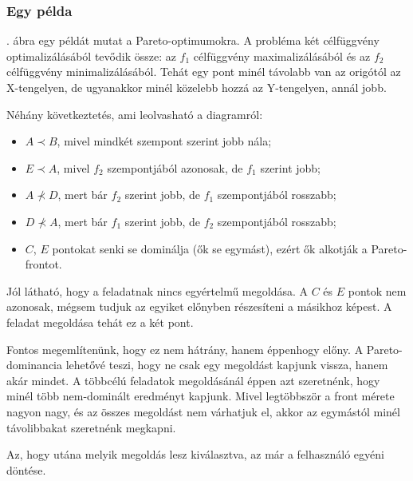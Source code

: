 \subsubsection{Egy példa}
. ábra egy példát mutat a Pareto-optimumokra.
A probléma két célfüggvény optimalizálásából tevődik össze: az $f_1$ célfüggvény maximalizálásából és az $f_2$ célfüggvény minimalizálásából.
Tehát egy pont minél távolabb van az origótól az X-tengelyen, de ugyanakkor minél közelebb hozzá az Y-tengelyen, annál jobb.

Néhány következtetés, ami leolvasható a diagramról:
\begin{itemize}
  \item[\textbullet] $A \prec B$, mivel mindkét szempont szerint jobb nála;
  \item[\textbullet] $E \prec A$, mivel $f_2$ szempontjából azonosak, de $f_1$ szerint jobb;
  \item[\textbullet] $A \nprec D$, mert bár $f_2$ szerint jobb, de $f_1$ szempontjából rosszabb;
  \item[\textbullet] $D \nprec A$, mert bár $f_1$ szerint jobb, de $f_2$ szempontjából rosszabb;
  \item[\textbullet] $C$, $E$ pontokat senki se dominálja (ők se egymást), ezért ők alkotják a Pareto-frontot.
\end{itemize}

Jól látható, hogy a feladatnak nincs egyértelmű megoldása.
A $C$ és $E$ pontok nem azonosak, mégsem tudjuk az egyiket előnyben részesíteni a másikhoz képest.
A feladat megoldása tehát ez a két pont.

Fontos megemlítenünk, hogy ez nem hátrány, hanem éppenhogy előny.
A Pareto-dominancia lehetővé teszi, hogy ne csak egy megoldást kapjunk vissza, hanem akár mindet.
A többcélú feladatok megoldásánál éppen azt szeretnénk, hogy minél több nem-dominált eredményt kapjunk.
Mivel legtöbbször a front mérete nagyon nagy, és az összes megoldást nem várhatjuk el, akkor az egymástól minél távolibbakat szeretnénk megkapni.

Az, hogy utána melyik megoldás lesz kiválasztva, az már a felhasználó egyéni döntése.

